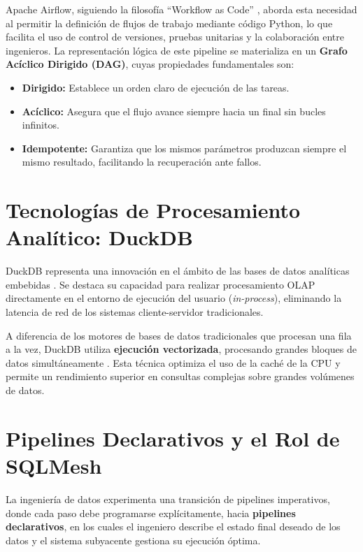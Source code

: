 Apache Airflow, siguiendo la filosofía ``Workflow as Code'' \parencite{harenslak2021data}, aborda esta necesidad al permitir la definición de flujos de trabajo mediante código Python, lo que facilita el uso de control de versiones, pruebas unitarias y la colaboración entre ingenieros. La representación lógica de este pipeline se materializa en un \textbf{Grafo Acíclico Dirigido (DAG)}, cuyas propiedades fundamentales son:

\begin{itemize}
    \item \textbf{Dirigido:} Establece un orden claro de ejecución de las tareas.
    \item \textbf{Acíclico:} Asegura que el flujo avance siempre hacia un final sin bucles infinitos.
    \item \textbf{Idempotente:} Garantiza que los mismos parámetros produzcan siempre el mismo resultado, facilitando la recuperación ante fallos.
\end{itemize}


\section{Tecnologías de Procesamiento Analítico: DuckDB}

DuckDB representa una innovación en el ámbito de las bases de datos analíticas embebidas \parencite{needham2024duckdb}. Se destaca su capacidad para realizar procesamiento OLAP directamente en el entorno de ejecución del usuario (\textit{in-process}), eliminando la latencia de red de los sistemas cliente-servidor tradicionales.

A diferencia de los motores de bases de datos tradicionales que procesan una fila a la vez, DuckDB utiliza \textbf{ejecución vectorizada}, procesando grandes bloques de datos simultáneamente \parencite{needham2024duckdb}. Esta técnica optimiza el uso de la caché de la CPU y permite un rendimiento superior en consultas complejas sobre grandes volúmenes de datos.


\section{Pipelines Declarativos y el Rol de SQLMesh}

La ingeniería de datos experimenta una transición de pipelines imperativos, donde cada paso debe programarse explícitamente, hacia \textbf{pipelines declarativos}, en los cuales el ingeniero describe el estado final deseado de los datos y el sistema subyacente gestiona su ejecución óptima.

